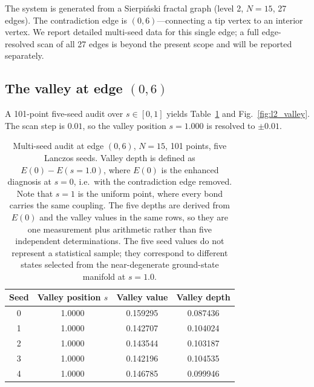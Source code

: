 \documentclass[aps,prb,reprint,superscriptaddress]{revtex4-2}
\begin{document}
The system is generated from a Sierpi\'{n}ski fractal graph (level 2, $N=15$, 27 edges). The contradiction edge is $(0,6)$---connecting a tip vertex to an interior vertex. We report detailed multi-seed data for this single edge; a full edge-resolved scan of all 27 edges is beyond the present scope and will be reported separately.

\subsection{The valley at edge $(0,6)$}

A 101-point five-seed audit over $s\in[0,1]$ yields Table~\ref{tab:l2_valley} and Fig.~\ref{fig:l2_valley}. The scan step is $0.01$, so the valley position $s=1.000$ is resolved to $\pm0.01$.

\begin{table}[h]
\centering
\caption{Multi-seed audit at edge $(0,6)$, $N=15$, 101 points, five Lanczos seeds. Valley depth is defined as $E(0)-E(s=1.0)$, where $E(0)$ is the enhanced diagnosis at $s=0$, i.e.\ with the contradiction edge removed. Note that $s=1$ is the uniform point, where every bond carries the same coupling. The five depths are derived from $E(0)$ and the valley values in the same rows, so they are one measurement plus arithmetic rather than five independent determinations. The five seed values do not represent a statistical sample; they correspond to different states selected from the near-degenerate ground-state manifold at $s=1.0$.}
\label{tab:l2_valley}
\begin{tabular}{cccc}
\toprule
Seed & Valley position $s$ & Valley value & Valley depth \\
\midrule
0 & 1.0000 & 0.159295 & 0.087436 \\
1 & 1.0000 & 0.142707 & 0.104024 \\
2 & 1.0000 & 0.143544 & 0.103187 \\
3 & 1.0000 & 0.142196 & 0.104535 \\
4 & 1.0000 & 0.146785 & 0.099946 \\
\bottomrule
\end{tabular}
\end{table}
\end{document}
